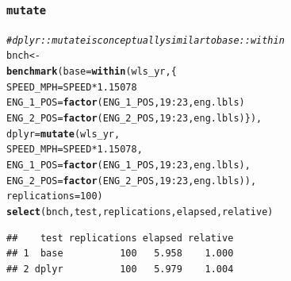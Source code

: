 \documentclass{beamer}\usepackage[]{graphicx}\usepackage[]{color}
\makeatletter
\newcommand{\hlnum}[1]{\textcolor[rgb]{0.686,0.059,0.569}{#1}}%
\newcommand{\hlcom}[1]{\textcolor[rgb]{0.678,0.584,0.686}{\textit{#1}}}%
\newcommand{\hlopt}[1]{\textcolor[rgb]{0,0,0}{#1}}%
\newcommand{\hlstd}[1]{\textcolor[rgb]{0.345,0.345,0.345}{#1}}%
\newcommand{\hlkwb}[1]{\textcolor[rgb]{0.69,0.353,0.396}{#1}}%
\newcommand{\hlkwc}[1]{\textcolor[rgb]{0.333,0.667,0.333}{#1}}%
\newcommand{\hlkwd}[1]{\textcolor[rgb]{0.737,0.353,0.396}{\textbf{#1}}}%
\newenvironment{kframe}{%
 \def\at@end@of@kframe{}%
 \ifinner\ifhmode%
  \def\at@end@of@kframe{\end{minipage}}%
  \begin{minipage}{\columnwidth}%
 \fi\fi%
 \def\FrameCommand##1{\hskip\@totalleftmargin \hskip-\fboxsep
 \colorbox{shadecolor}{##1}\hskip-\fboxsep
     \hskip-\linewidth \hskip-\@totalleftmargin \hskip\columnwidth}%
 \MakeFramed {\advance\hsize-\width
   \@totalleftmargin\z@ \linewidth\hsize
   \@setminipage}}%
 {\par\unskip\endMakeFramed%
 \at@end@of@kframe}
\newenvironment{knitrout}{}{} %
\makeatother
\begin{document}
\begin{frame}[fragile]
  \frametitle{{\tt mutate}}
\begin{knitrout}\footnotesize
{}\color{fgcolor}\begin{kframe}
\begin{alltt}
\hlcom{# dplyr::mutate is conceptually similar to base::within}
\hlstd{bnch} \hlkwb{<-}
\hlkwd{benchmark}\hlstd{(}\hlkwc{base} \hlstd{=} \hlkwd{within}\hlstd{(wls_yr, \{}
                        \hlstd{SPEED_MPH} \hlkwb{=} \hlstd{SPEED} \hlopt{*} \hlnum{1.15078}
                        \hlstd{ENG_1_POS} \hlkwb{=} \hlkwd{factor}\hlstd{(ENG_1_POS,} \hlnum{19}\hlopt{:}\hlnum{23}\hlstd{, eng.lbls)}
                        \hlstd{ENG_2_POS} \hlkwb{=} \hlkwd{factor}\hlstd{(ENG_2_POS,} \hlnum{19}\hlopt{:}\hlnum{23}\hlstd{, eng.lbls)\}),}
          \hlkwc{dplyr} \hlstd{=} \hlkwd{mutate}\hlstd{(wls_yr,}
                         \hlkwc{SPEED_MPH} \hlstd{= SPEED} \hlopt{*} \hlnum{1.15078}\hlstd{,}
                         \hlkwc{ENG_1_POS} \hlstd{=} \hlkwd{factor}\hlstd{(ENG_1_POS,} \hlnum{19}\hlopt{:}\hlnum{23}\hlstd{, eng.lbls),}
                         \hlkwc{ENG_2_POS} \hlstd{=} \hlkwd{factor}\hlstd{(ENG_2_POS,} \hlnum{19}\hlopt{:}\hlnum{23}\hlstd{, eng.lbls)),}
          \hlkwc{replications} \hlstd{=} \hlnum{100}\hlstd{)}
\hlkwd{select}\hlstd{(bnch, test, replications, elapsed, relative)}
\end{alltt}
\begin{verbatim}
##    test replications elapsed relative
## 1  base          100   5.958    1.000
## 2 dplyr          100   5.979    1.004
\end{verbatim}
\end{kframe}
\end{knitrout}
\end{frame} 
\end{document}
